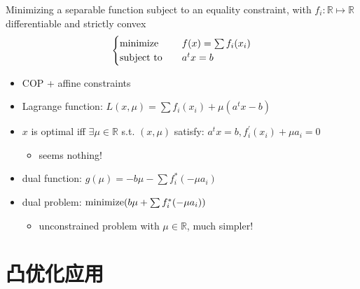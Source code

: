 \begin{remark}
    Minimizing a separable function subject to an equality constraint, with $f_i: \mathbb{R} \mapsto \mathbb{R}$ differentiable and strictly convex\[\begin{cases}
        \operatorname{minimize}\quad &f(x) = \sum f_i(x_i)\\
        \operatorname{subject\ to}\quad &a^tx = b
    \end{cases}\]
    \begin{itemize}
        \item COP + affine constraints
        \item Lagrange function: $L(x, \mu) = \sum f_i(x_i) + \mu(a^tx - b)$
        \item $x$ is optimal iff $\exists \mu \in \mathbb{R}$ s.t. $(x, \mu)$ satisfy: $a^tx = b, f_i^\prime(x_i) + \mu a_i = 0$\begin{itemize}
            \item seems nothing!
        \end{itemize}
        \item dual function: $g(\mu) = -b\mu - \sum f_i^*(-\mu a_i)$
        \item dual problem: $\operatorname{minimize} (b\mu + \sum f_i^*(-\mu a_i))$\begin{itemize}
            \item unconstrained problem with $\mu \in \mathbb{R}$, much simpler!
        \end{itemize}
    \end{itemize}
\end{remark}

\section{凸优化应用}
